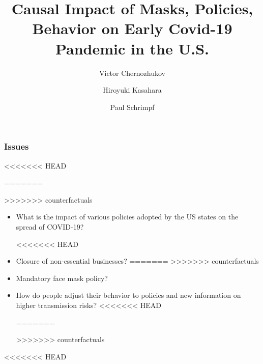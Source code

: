 \documentclass{beamer}
\title[Causal Impact of Masks, Policies, Behavior]
{Causal Impact of Masks, Policies, Behavior on Early Covid-19 Pandemic in the U.S.}
\author[Victor Chernozhukov, Hiroyuki Kasahara, Paul Schrimpf] %
{Victor Chernozhukov\inst{1} \and Hiroyuki Kasahara\inst{2} \and Paul Schrimpf\inst{2}}
\institute[] %
{
  \inst{1}%
  Department of Economics and Center for Statistics and Data Science, MIT
  \and
  \inst{2}%
<<<<<<< HEAD
  Vancouver School of Economics, 
  UBC }
\date[June 2020] %
{}
\begin{document}
\begin{frame}
  \titlepage
\end{frame}





\begin{frame}
  \frametitle{Issues}%
\large
<<<<<<< HEAD
 
=======

>>>>>>> counterfactuals
\begin{itemize}

\item What is the  impact of various policies adopted by the US states on the spread of COVID-19?\medskip

<<<<<<< HEAD
\item Closure of non-essential businesses?\medskip
=======
>>>>>>> counterfactuals

\item Mandatory face mask policy?\medskip

\item How do people adjust their behavior to policies and  new  information on higher transmission risks?
<<<<<<< HEAD
 
=======

>>>>>>> counterfactuals
\end{itemize}

\end{frame}


<<<<<<< HEAD
 

 
 
 
 
\end{document}
